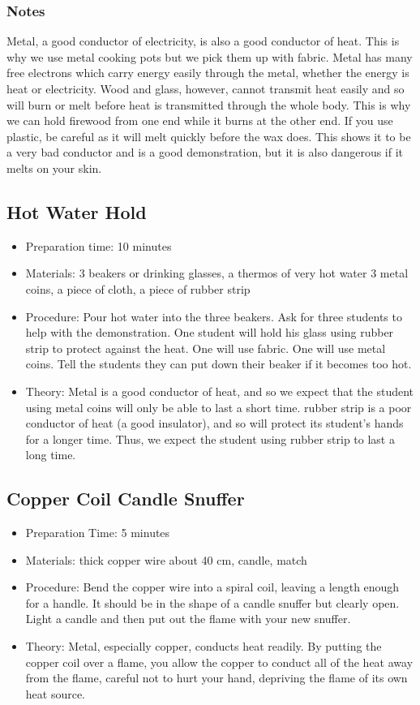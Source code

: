 \subsubsection*{Notes}
Metal, a good conductor of electricity, is also a good conductor of heat. This is why we use metal cooking pots but we pick them up with fabric. Metal has many free electrons which carry energy easily through the metal, whether the energy is heat or electricity. Wood and glass, however, cannot transmit heat easily and so will burn or melt before heat is transmitted through the whole body. This is why we can hold firewood from one end while it burns at the other end.  
If you use plastic, be careful as it will melt quickly before the wax does. This shows it to be a very bad conductor and is a good demonstration, but it is also dangerous if it melts on your skin.  


\subsection{Hot Water Hold}
\begin{itemize}
\item{Preparation time: 10 minutes}
\item{Materials: 3 beakers or drinking glasses, a thermos of very hot water 3 metal coins, a piece of cloth, a piece of rubber strip}
\item{Procedure: Pour hot water into the three beakers. Ask for three students to help with the demonstration. One student will hold his glass using rubber strip to protect against the heat. One will use fabric. One will use metal coins. Tell the students they can put down their beaker if it becomes too hot.}
\item{Theory: Metal is a good conductor of heat, and so we expect that the student using metal coins will only be able to last a short time. rubber strip is a poor conductor of heat (a good insulator), and so will protect its student’s hands for a longer time. Thus, we expect the student using rubber strip to last a long time.}
\end{itemize}


\subsection{Copper Coil Candle Snuffer}
\begin{itemize}
\item{Preparation Time: 5 minutes}
\item{Materials: thick copper wire about 40 cm, candle, match}
\item{Procedure: Bend the copper wire into a spiral coil, leaving a length enough for a handle. It should be in the shape of a candle snuffer but clearly open. Light a candle and then put out the flame with your new snuffer.}
\item{Theory: Metal, especially copper, conducts heat readily. By putting the copper coil over a flame, you allow the copper to conduct all of the heat away from the flame, careful not to hurt your hand, depriving the flame of its own heat source.}
\end{itemize}


